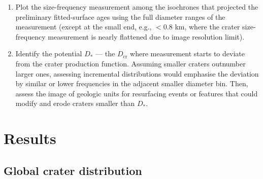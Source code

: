 \documentclass[preprint,12pt,3p,times,authoryear]{elsarticle}
\begin{document}
\begin{enumerate}
    \item Plot the size-frequency measurement among the isochrones that projected the preliminary fitted-surface ages using the full diameter ranges of the measurement (except at the small end, e.g., $< 0.8$ km, where the crater size-frequency measurement is nearly flattened due to image resolution limit).
    \item Identify the potential $D_*$ — the $D_{\text{cr}}$ where measurement starts to deviate from the crater production function. Assuming smaller craters outnumber larger ones, assessing incremental distributions would emphasise the deviation by similar or lower frequencies in the adjacent smaller diameter bin. Then, assess the image of geologic units for resurfacing events or features that could modify and erode craters smaller than $D_*$.
\end{enumerate}

\section{Results}

\subsection{Global crater distribution}
\label{subsec:crater_dist}
\end{document}
